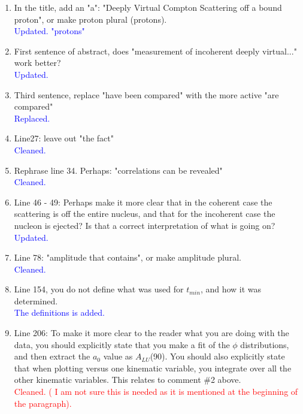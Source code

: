 \documentclass[a4paper,11pt,twoside]{article}
\begin{document}
\begin{enumerate}
  
\item    In the title, add an "a":  "Deeply Virtual Compton Scattering off a bound proton", or make proton plural (protons).\\
   \textcolor{blue}{Updated. "protons"}

\item    First sentence of abstract, does "measurement of incoherent deeply 
   virtual..." work better?\\
   \textcolor{blue}{Updated. }

\item    Third sentence, replace "have been compared" with the more active "are compared"\\
   \textcolor{blue}{Replaced. }

\item    Line27: leave out "the fact"\\
   \textcolor{blue}{Cleaned. }

\item    Rephrase line 34. Perhaps:  "correlations can be revealed"\\
   \textcolor{blue}{Cleaned. }

\item    Line 46 - 49: Perhaps make it more clear that in the coherent case the scattering is off the entire nucleus, and that for the incoherent case the nucleon is ejected? Is that a correct interpretation of what is going on?\\
   \textcolor{blue}{Updated.}

\item    Line 78: "amplitude that contains", or make amplitude plural.\\
   \textcolor{blue}{Cleaned.}

\item    Line 154, you do not define what was used for $t_{min}$, and how it 
   was determined.\\
   \textcolor{blue}{The definitions is added.}

\item    Line 206: To make it more clear to the reader what you are doing with 
   the data, you should explicitly state that you make a fit of the $\phi$ 
      distributions, and then extract the $a_0$ value as $A_{LU}$(90). You 
      should also explicitly state that when plotting versus one kinematic 
      variable, you integrate over all the other kinematic variables. This 
      relates to comment \#2 above.\\
      \textcolor{red}{Cleaned. ( I am not sure this is needed as it is 
      mentioned at the beginning of the paragraph).}


\end{enumerate}
\end{document}
